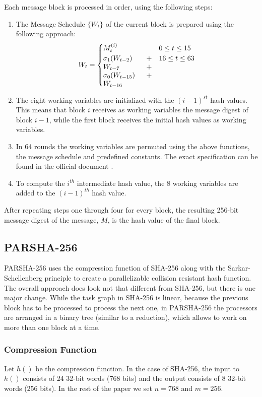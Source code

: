 \documentclass[letterpaper]{article}
\begin{document}
Each message block is processed in order, using the following steps:
\begin{enumerate}
\item The Message Schedule $\{ W_t \}$ of the current block is prepared using the following approach:\\
$$W_t = \begin{cases}
M_t^{(i)} & 0 \leq t \leq 15 \\
 \parbox[t]{.2\textwidth}{$\sigma_1(W_{t-2})+ W_{t-7} + \sigma_0(W_{t-15})+W_{t-16}$} & 16 \leq t \leq 63
\end{cases}$$

\item The eight  working variables are initialized with the  $(i-1)^{st}$ hash values. This means that block $i$ receives as working variables the message digest of block $i-1$, while the first block receives the initial hash values as working variables. 

\item In 64 rounds the working variables are permuted using the above functions, the message schedule and predefined constants. The exact specification can be found in the official document \cite{sha}. 

\item To compute the $i^{th}$ intermediate hash value, the 8 working variables are added to the $(i-1)^{th}$ hash value.


\end{enumerate}

After repeating steps one through four  for every block, the resulting 256-bit message digest of the message, $M$, is the hash value of the final block.

\subsection{PARSHA-256 \cite{parsha256}}
PARSHA-256 uses the compression function of SHA-256 along with the Sarkar-Schellenberg \cite{sarkar} principle to create a parallelizable collision resistant hash function. The overall approach does look not that different from SHA-256, but there is one major change. While the task graph in SHA-256 is linear, because the previous block has to be processed to process the next one, in PARSHA-256 the processors are arranged in a binary tree (similar to a reduction), which allows to work on more than one block at a time. 

\subsubsection{Compression Function}
Let $h()$ be the compression function. In the case of SHA-256, the input to $h()$ consists of 24 32-bit words (768 bits) and the output consists of 8 32-bit words (256 bits). In the rest of the paper we set $n = 768$ and $m = 256$.
\end{document}
